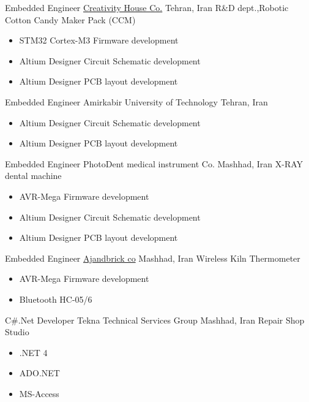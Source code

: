	{Embedded Engineer}
	{\href{https://www.instagram.com/creativityhouse.ir/}{\color{blue}Creativity House Co.}}
        {Tehran, Iran}
	{
         \newline
         R\&D dept.,Robotic Cotton Candy Maker Pack (CCM) }
         {
         \begin{itemize}
            \item STM32 Cortex-M3 Firmware development
            \item Altium Designer Circuit Schematic development
            \item Altium Designer  PCB layout development
         \end{itemize}
         }


    {Embedded Engineer}
    {Amirkabir University of Technology}
    {Tehran, Iran}
    {
    \newline
    \href{https://phee.aut.ac.ir/en}{\color{blue}{Physics and Energy Faculty}}}
    {
    \begin{itemize}
        \item Altium Designer Circuit Schematic development
        \item Altium Designer  PCB layout development
    \end{itemize}
     }
     
	{Embedded Engineer}
	{PhotoDent medical instrument Co.}
        {Mashhad, Iran}
	{
         \newline
         X-RAY dental machine
         }
        {
        \begin{itemize}
            \item AVR-Mega Firmware development
            \item Altium Designer Circuit Schematic development
            \item Altium Designer  PCB layout development 
        \end{itemize}
        }
	{Embedded Engineer}
	{\href{http://ajandbrick.co/}{\color{blue}Ajandbrick co}}
        {Mashhad, Iran}
	{
         \newline
         Wireless Kiln Thermometer}
         {
         \begin{itemize}
             \item AVR-Mega Firmware development
             \item Bluetooth HC-05/6
         \end{itemize}
         }

	{C\#.Net Developer}
	{Tekna Technical Services Group}
        {Mashhad, Iran}
	{ \newline
         Repair Shop Studio
        }
        {
        \begin{itemize}
           \item .NET 4
           \item ADO.NET 
           \item MS-Access
        \end{itemize}
        }


